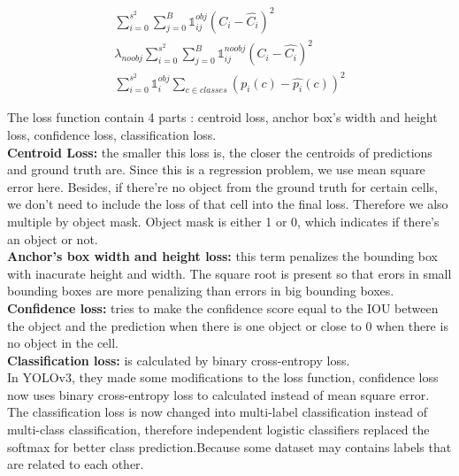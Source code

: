 \begin{enumerate}
\begin{align}
                    \displaystyle\sum_{i=0}^{s^2} \displaystyle\sum_{j=0}^{B} \mathbb{1}_{ij}^{obj} (C_i - \hat{C_i})^2 \\ 
                    \lambda_{noobj} \displaystyle\sum_{i=0}^{s^2} \displaystyle\sum_{j=0}^{B} \mathbb{1}_{ij}^{noobj} (C_i - \hat{C_i})^2 \\ 
                    \displaystyle\sum_{i=0}^{s^2} \mathbb{1}_{i}^{obj} \displaystyle\sum_{c \in classes} (p_i(c) - \hat{p_i}(c))^2
                \end{align}
                \vspace{3mm}
                \par The loss function contain 4 parts : centroid loss, anchor box's width and height loss, confidence loss, classification loss. \\
                \vspace{3mm}
                \textbf{Centroid Loss:} the smaller this loss is, the closer the centroids of predictions and ground truth are. Since this is a regression problem, we use mean square error here. Besides, if there're no object from the ground truth for certain cells, we don't need to include the loss of that cell into the final loss. Therefore we also multiple by object mask. Object mask is either 1 or 0, which indicates if there's an object or not. \\ 
                \vspace{2mm}
                \textbf{Anchor's box width and height loss:} this term penalizes the bounding box with inacurate height and width. The square root is present so that erors in small bounding boxes are more penalizing than errors in big bounding boxes. \\ 
                \vspace{2mm}
                \textbf{Confidence loss:} tries to make the confidence score equal to the IOU between the object and the prediction when there is one object or close to 0 when there is no object in the cell. \\ 
                \vspace{2mm}
                \textbf{Classification loss:} is calculated by binary cross-entropy loss. \\
                \vspace{3mm}
                In YOLOv3, they made some modifications to the loss function, confidence loss now uses binary cross-entropy loss to calculated instead of mean square error. The classification loss is now changed into multi-label classification instead of multi-class classification, therefore independent logistic classifiers replaced the softmax for better class prediction.Because some dataset may contains labels that are related to each other.  
            \end{enumerate}
